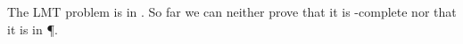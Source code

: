 The LMT problem is in \NP. So far we can neither prove that it is \NP-complete
nor that it is in \P.
